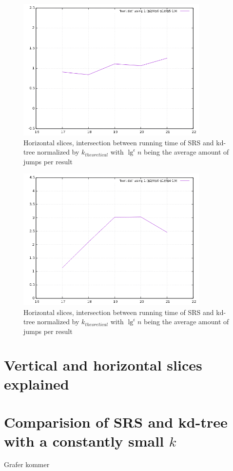 \begin{figure}[h]
    \centering
    \includegraphics[width = 0.85\textwidth]{pictures/analysis/hori_theory.png}
    \caption{Horizontal slices, intersection between running time of SRS and kd-tree normalized by $k_{theoretical}$ with $\lg^\epsilon n$ being the average amount of jumps per result}\label{fig:vert_theory}
\end{figure}


\begin{figure}[h]
    \centering
    \includegraphics[width = 0.85\textwidth]{pictures/analysis/hori_theory_worst_jump.png}
    \caption{Horizontal slices, intersection between running time of SRS and kd-tree normalized by $k_{theoretical}$ with $\lg^\epsilon n$ being the average amount of jumps per result}\label{fig:vert_theory}
\end{figure}

\section{Vertical and horizontal slices explained}



\section{Comparision of SRS and kd-tree with a constantly small $k$}

Grafer kommer
